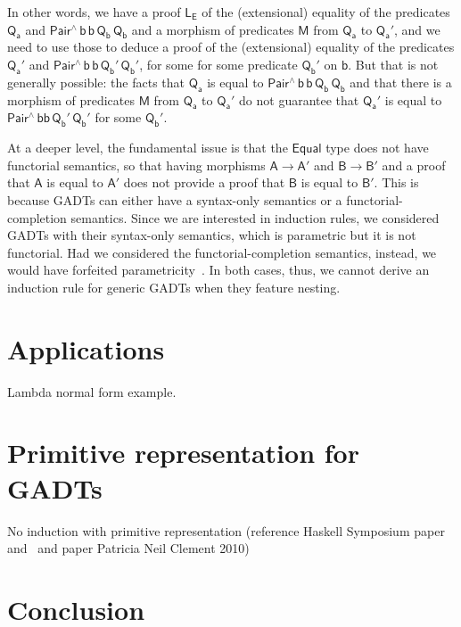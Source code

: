 \documentclass[acmsmall,screen,review,anonymous]{acmart}
\theoremstyle{definition}
\begin{document}
In other words, we have a proof $\mathsf{L_E}$ of the (extensional) equality
of the predicates $\mathsf{Q_a}$ and $\mathsf{Pair^{\wedge}\,b\,b\,Q_b\,Q_b}$
and a morphism of predicates $\mathsf{M}$ from $\mathsf{Q_a}$ to $\mathsf{Q_a'}$,
and we need to use those to deduce a proof of the (extensional) equality
of the predicates $\mathsf{Q_a'}$ and $\mathsf{Pair^{\wedge}\,b\,b\,Q_b'\,Q_b'}$,
for some  for some predicate $\mathsf{Q_b'}$ on $\mathsf{b}$.
But that is not generally possible:
the facts that $\mathsf{Q_a}$ is equal to $\mathsf{Pair^{\wedge}\,b\,b\,Q_b\,Q_b}$
and that there is a morphism of predicates $\mathsf{M}$ from $\mathsf{Q_a}$ to $\mathsf{Q_a'}$
do not guarantee that $\mathsf{Q_a'}$ is equal to $\mathsf{Pair^{\wedge}\,bb\,Q_b'\,Q_b'}$ for some $\mathsf{Q_b'}$.

At a deeper level, the fundamental issue is that
the $\mathsf{Equal}$ type does not have functorial semantics,
so that having morphisms $\mathsf{A \to A'}$ and $\mathsf{B \to B'}$
and a proof that $\mathsf{A}$ is equal to $\mathsf{A'}$
does not provide a proof that $\mathsf{B}$ is equal to $\mathsf{B'}$.
This is because GADTs can either have a syntax-only semantics or a functorial-completion semantics.
Since we are interested in induction rules, we considered GADTs with their syntax-only semantics,
which is parametric but it is not functorial.
Had we considered the functorial-completion semantics, instead,
we would have forfeited parametricity~\cite{HaskellPaper}.
In both cases, thus, we cannot derive an induction rule for generic GADTs when they feature nesting.



\section{Applications}

Lambda normal form example.



\section{Primitive representation for GADTs}

No induction with primitive representation (reference Haskell Symposium paper and~\cite{jp19} and paper Patricia Neil Clement 2010)



\section{Conclusion}
\end{document}
